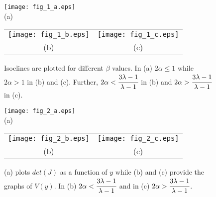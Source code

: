 \documentclass[11pt]{article}
\begin{document}
\begin{figure}
\begin{center}
\texttt{[image: fig\_1\_a.eps]} \\
(a)
\\
\begin{tabular}{cc}
\texttt{[image: fig\_1\_b.eps]}
&
\texttt{[image: fig\_1\_c.eps]}
\\
(b) & (c)
\end{tabular}
\end{center}

\caption{Isoclines are plotted for different $\beta$ values. In
(a) $2\alpha\leq 1$ while $2\alpha>1$ in (b) and (c). Further,
$2\alpha<\cfrac{3\lambda-1}{\lambda-1}$ in (b) and
$2\alpha>\cfrac{3\lambda-1}{\lambda-1}$ in (c).}
\end{figure}


\begin{figure}
\begin{center}
\texttt{[image: fig\_2\_a.eps]}
\\
(a)
\\
\begin{tabular}{cc}
\texttt{[image: fig\_2\_b.eps]} &
\texttt{[image: fig\_2\_c.eps]}
\\
(b) & (c)
\end{tabular}
\end{center}
\caption{(a) plots $det(J)$ as a function of $y$  while (b) and
(c) provide the graphs of $V(y)$. In (b)
$2\alpha<\cfrac{3\lambda-1}{\lambda-1}$ and in (c)
$2\alpha>\cfrac{3\lambda-1}{\lambda-1}$.}
\end{figure}
\end{document}

